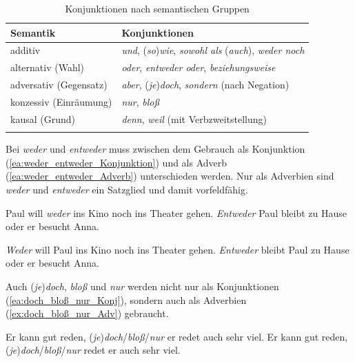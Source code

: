 \begin{table}
  \centering
  \begin{tabular}{l l}
    \lsptoprule
    Semantik & Konjunktionen \\
    \hline
    additiv & \textit{und}, (\textit{so})\textit{wie}, \textit{sowohl als} (\textit{auch}), \textit{weder noch} \\
    
    alternativ (Wahl) & \textit{oder}, \textit{entweder oder}, \textit{beziehungsweise} \\
    
    adversativ (Gegensatz) & \textit{aber}, (\textit{je})\textit{doch}, \textit{sondern} (nach Negation) \\
    
    konzessiv (Einräumung) & \textit{nur}, \textit{bloß} \\
    
    kausal (Grund) &  \textit{denn}, \textit{weil} (mit Verbzweitstellung) \\ 
    
    \lspbottomrule 
  \end{tabular}
  \caption{Konjunktionen nach semantischen Gruppen}
  \label{tab:Konjunktion_Semantik}
\end{table}

Bei \textit{weder} und \textit{entweder} muss zwischen dem Gebrauch als Konjunktion (\ref{ea:weder_entweder_Konjunktion}) und als Adverb (\ref{ea:weder_entweder_Adverb}) unterschieden werden. Nur als Adverbien sind \textit{weder} und \textit{entweder} ein Satzglied und damit vorfeldfähig. 

\ea \label{ea:weder_entweder_Konjunktion}
\ea \label{ea:weder_Konj} Paul will \textit{weder} ins Kino noch ins Theater gehen.
\ex \label{ex:entweder_Konj} \textit{Entweder} Paul bleibt zu Hause oder er besucht Anna.
\z 
\z 

\ea \label{ea:weder_entweder_Adverb}
\ea \label{ea:weder_Adverb} \textit{Weder} will Paul ins Kino noch ins Theater gehen.
\ex \label{ex:entweder_Adverb} \textit{Entweder} bleibt Paul zu Hause oder er besucht Anna.
\z 
\z 

Auch (\textit{je})\textit{doch}, \textit{bloß} und \textit{nur} werden nicht nur als Konjunktionen (\ref{ea:doch_bloß_nur_Konj}), sondern auch als Adverbien (\ref{ex:doch_bloß_nur_Adv}) gebraucht.

\ea \label{ea:doch_bloß_nur_Konj_Adv}
\ea \label{ea:doch_bloß_nur_Konj} Er kann gut reden, (\textit{je})\textit{doch}/\textit{bloß}/\textit{nur} er redet auch sehr viel.
\ex \label{ex:doch_bloß_nur_Adv} Er kann gut reden, (\textit{je})\textit{doch}/\textit{bloß}/\textit{nur} redet er auch sehr viel.
\z 
\z 

